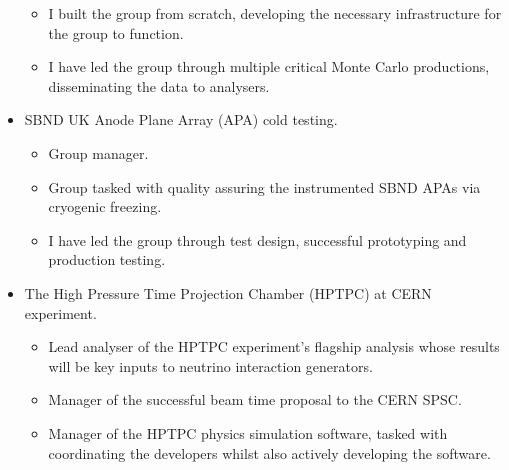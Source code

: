 \documentclass[margin,line]{res}
\begin{document}
\begin{resume}
\begin{itemize}
\begin{itemize}
\item I built the group from scratch, developing the necessary infrastructure for the group to function.
\item I have led the group through multiple critical Monte Carlo productions, disseminating the data to analysers.
\end{itemize}
\item SBND UK Anode Plane Array (APA) cold testing.
\begin{itemize}
\item Group manager.
\item Group tasked with quality assuring the instrumented SBND APAs via cryogenic freezing.
\item I have led the group through test design, successful prototyping and production testing.
\end{itemize}
\item The High Pressure Time Projection Chamber (HPTPC) at CERN experiment.
\begin{itemize}
\item Lead analyser of the HPTPC experiment's flagship analysis whose results will be key inputs to neutrino interaction generators.
\item Manager of the successful beam time proposal to the CERN SPSC. 
\item Manager of the HPTPC physics simulation software, tasked with coordinating the developers whilst also actively developing the software.
\end{itemize}
\end{itemize}






\end{resume}
\end{document}
